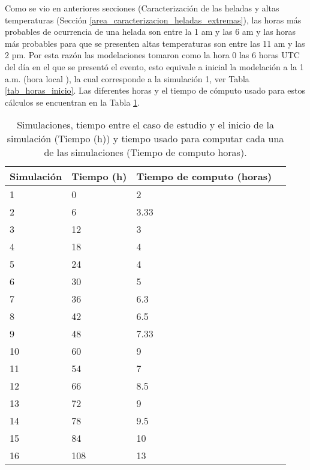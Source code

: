 Como se vio en anteriores secciones (Caracterización de las heladas y altas temperaturas (Sección \ref{area_caracterizacion_heladas_extremas}), las horas más probables de ocurrencia de una helada son entre la 1 am y las 6 am y las horas más probables para que se presenten altas temperaturas son entre las 11 am y las 2 pm. Por esta razón las modelaciones tomaron como la hora 0 las 6 horas UTC del día en el que se presentó el evento, esto equivale a inicial la modelación a la 1 a.m. (hora local ), la cual corresponde a la simulación 1, ver Tabla \ref{tab_horas_inicio}. Las diferentes horas y el tiempo de cómputo usado para estos cálculos se encuentran en la Tabla \ref{tabla:tiempos_inicializacion}.\\


\begin{table}[]
\centering
\caption{Simulaciones, tiempo entre el caso de estudio y el inicio de la simulación (Tiempo (h)) y tiempo usado para computar cada una de las simulaciones (Tiempo de computo horas).}
\label{tabla:tiempos_inicializacion}
\begin{tabular}{llll}
Simulación    & Tiempo (h)    & Tiempo de computo (horas) \\ \hline
  1   &  0            &     2           \\
  2   &  6            &     3.33           \\
  3   &  12           &     3           \\
  4   &  18           &     4           \\ 
  5   &  24           &     4           \\ 
  6   &  30           &     5           \\ 
  7   &  36           &     6.3          \\ 
  8  &  42           &     6.5          \\ 
 9   &  48           &     7.33          \\
 10   &  60           &     9          \\
  11  &  54           &     7          \\
   12 & 66           &     8.5          \\
   13 &  72         &     9          \\
  14  &  78         &     9.5          \\
  15  &  84           &     10           \\
  16  &  108          &     13           \\


            


 
\end{tabular}
\end{table}


